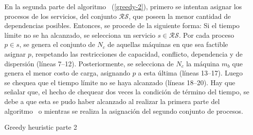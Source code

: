 \documentclass[../informe2.tex]{subfiles}
\begin{document}
\noindent En la segunda parte del algoritmo \greedy\ (\ref{greedy-2}), primero se intentan asignar los procesos de los servicios, del conjunto $\mathcal{RS}$, que poseen la menor cantidad de dependencias posibles. Entonces, se procede de la siguiente forma: Si el tiempo límite no se ha alcanzado, se selecciona un servicio $s \in \mathcal{RS}$. Por cada proceso $p \in s$, se genera el conjunto de $N_c$ de aquellas máquinas en que sea factible asignar $p$, respetando las restricciones de capacidad, conflicto, dependencia y de dispersión (líneas 7--12). Posteriormente, se selecciona de $N_c$ la máquina $m_b$ que genera el menor costo de carga, asignando $p$ a esta última (líneas 13--17). Luego se chequea que el tiempo límite no se haya alcanzado (líneas 18--20). Hay que señalar que, el hecho de chequear dos veces la condición de término del tiempo, se debe a que esta se pudo haber alcanzado al realizar la primera parte del algoritmo \greedy\ o mientras se realiza la asignación del segundo conjunto de procesos.
\begin{algorithm}[ht!]
	\caption{Greedy heuristic parte 2}\label{greedy-2}
	\begin{algorithmic}[1]
			\EndIf{}
					\EndIf{}
				\EndFor{}
				\EndIf{}
				\EndIf{}
			\EndFor{}
		\EndFor{}
		\EndProcedure{}
	\end{algorithmic}
\end{algorithm}
\end{document}
